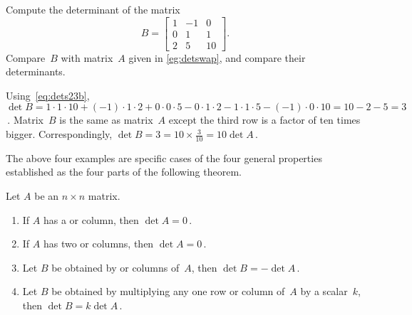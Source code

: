 \begin{example} \label{eg:}
Compute the determinant of the matrix
\begin{equation*}
B=\begin{bmatrix} 1&-1&0
\\0&1&1
\\2&5&10 \end{bmatrix}.
\end{equation*}
Compare~\(B\) with matrix~\(A\) given in \autoref{eg:detswap}, and compare their determinants.
\begin{solution} 
Using~\eqref{eq:dets23b}, \(\det B 
=1\cdot1\cdot10 +(-1)\cdot1\cdot2 +0\cdot0\cdot5
-0\cdot1\cdot2 -1\cdot1\cdot5 -(-1)\cdot0\cdot10 
=10-2-5=3\)\,.  
Matrix~\(B\) is the same as matrix~\(A\) except the third row is a factor of ten times bigger.
Correspondingly, \(\det B=3=10\times\frac3{10}=10\det A\)\,.
\end{solution}
\end{example}






The above four examples are specific cases of the four general properties established as the four parts of the following theorem. 


\begin{theorem} \label{thm:ppdet} 
Let \(A\) be an \(n\times n\) matrix.
\begin{enumerate}
\item\label{thm:ppdet:i} 
If \(A\) has a  or column, then \(\det A=0\)\,.
\item\label{thm:ppdet:ii} 
If \(A\) has two  or columns, then  \(\det A=0\)\,.
\item\label{thm:ppdet:iii} 
Let \(B\) be obtained by  or columns of~\(A\), then \(\det B=-\det A\)\,.
\item\label{thm:ppdet:iv} 
Let \(B\) be obtained by multiplying any one row or column of~\(A\) by a scalar~\(k\), then \(\det B=k\det A\)\,.
\end{enumerate}
\end{theorem}

